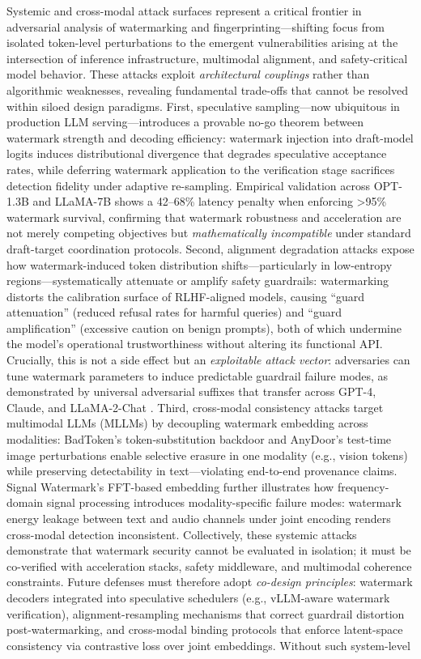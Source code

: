 \documentclass[11pt,a4paper]{article}
\begin{document}
Systemic and cross-modal attack surfaces represent a critical frontier in adversarial analysis of watermarking and fingerprinting---shifting focus from isolated token-level perturbations to the emergent vulnerabilities arising at the intersection of inference infrastructure, multimodal alignment, and safety-critical model behavior. These attacks exploit \emph{architectural couplings} rather than algorithmic weaknesses, revealing fundamental trade-offs that cannot be resolved within siloed design paradigms. First, speculative sampling---now ubiquitous in production LLM serving---introduces a provable no-go theorem between watermark strength and decoding efficiency: watermark injection into draft-model logits induces distributional divergence that degrades speculative acceptance rates, while deferring watermark application to the verification stage sacrifices detection fidelity under adaptive re-sampling. Empirical validation across OPT-1.3B and LLaMA-7B shows a 42--68\% latency penalty when enforcing >95\% watermark survival, confirming that watermark robustness and acceleration are not merely competing objectives but \emph{mathematically incompatible} under standard draft-target coordination protocols. Second, alignment degradation attacks expose how watermark-induced token distribution shifts---particularly in low-entropy regions---systematically attenuate or amplify safety guardrails: watermarking distorts the calibration surface of RLHF-aligned models, causing ``guard attenuation'' (reduced refusal rates for harmful queries) and ``guard amplification'' (excessive caution on benign prompts), both of which undermine the model's operational trustworthiness without altering its functional API. Crucially, this is not a side effect but an \emph{exploitable attack vector}: adversaries can tune watermark parameters to induce predictable guardrail failure modes, as demonstrated by universal adversarial suffixes that transfer across GPT-4, Claude, and LLaMA-2-Chat \cite{arxiv:2307.15043}. Third, cross-modal consistency attacks target multimodal LLMs (MLLMs) by decoupling watermark embedding across modalities: BadToken's token-substitution backdoor \cite{doi:10.1109/cvpr52734.2025.02785} and AnyDoor's test-time image perturbations \cite{arxiv:2402.08577} enable selective erasure in one modality (e.g., vision tokens) while preserving detectability in text---violating end-to-end provenance claims. Signal Watermark's FFT-based embedding \cite{arxiv:2410.06545} further illustrates how frequency-domain signal processing introduces modality-specific failure modes: watermark energy leakage between text and audio channels under joint encoding renders cross-modal detection inconsistent. Collectively, these systemic attacks demonstrate that watermark security cannot be evaluated in isolation; it must be co-verified with acceleration stacks, safety middleware, and multimodal coherence constraints. Future defenses must therefore adopt \emph{co-design principles}: watermark decoders integrated into speculative schedulers (e.g., vLLM-aware watermark verification), alignment-resampling mechanisms that correct guardrail distortion post-watermarking, and cross-modal binding protocols that enforce latent-space consistency via contrastive loss over joint embeddings. Without such system-level 
\end{document}
